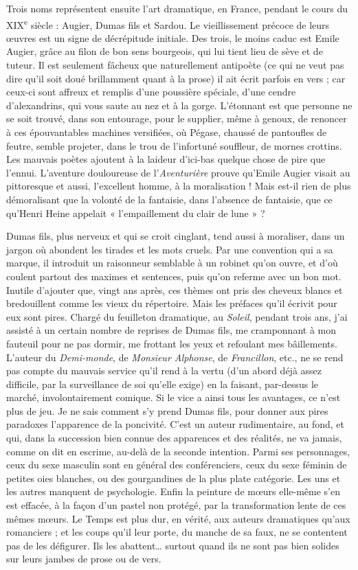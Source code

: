 \documentclass[french,twoside]{book} %
\begin{document}
Trois noms représentent ensuite l’art dramatique, en France, pendant le cours du XIX\textsuperscript{e} siècle : Augier, Dumas fils et Sardou. Le vieillissement précoce de leurs œuvres est un signe de décrépitude initiale. Des trois, le moins caduc est Emile Augier, grâce au filon de bon sens bourgeois, qui lui tient lieu de sève et de tuteur. Il est seulement fâcheux que naturellement antipoète (ce qui ne veut pas dire qu’il soit doué brillamment quant à la prose) il ait écrit parfois en vers ; car ceux-ci sont affreux et remplis d’une poussière spéciale, d’une cendre d’alexandrins, qui vous saute au nez et à la gorge. L’étonnant est que personne ne se soit trouvé, dans son entourage, pour le supplier, même à genoux, de renoncer à ces épouvantables machines versifiées, où Pégase, chaussé de pantoufles de feutre, semble projeter, dans le trou de l’infortuné souffleur, de mornes crottins. Les mauvais poètes ajoutent à la laideur d’ici-bas quelque chose de pire que l’ennui. L’aventure douloureuse de l’{\itshape Aventurière} prouve qu’Emile Augier visait au pittoresque et aussi, l’excellent homme, à la moralisation ! Mais est-il rien de plus démoralisant que la volonté de la fantaisie, dans l’absence de fantaisie, que ce qu’Henri Heine appelait « l’empaillement du clair de lune » ?\par
Dumas fils, plus nerveux et qui se croit cinglant, tend aussi à moraliser, dans un jargon où abondent les tirades et les mots cruels. Par une convention qui a sa marque, il introduit un raisonneur semblable à un robinet qu’on ouvre, et d’où coulent partout des maximes et sentences, puis qu’on referme avec un bon mot. Inutile d’ajouter que, vingt ans après, ces thèmes ont pris des cheveux blancs et bredouillent comme les vieux du répertoire. Mais les préfaces qu’il écrivit pour eux sont pires. Chargé du feuilleton dramatique, au {\itshape Soleil}, pendant trois ans, j’ai assisté à un certain nombre de reprises de Dumas fils, me cramponnant à mon fauteuil pour ne pas dormir, me frottant les yeux et refoulant mes bâillements. L’auteur du {\itshape Demi-monde}, de {\itshape Monsieur Alphonse}, de {\itshape Francillon}, etc., ne se rend pas compte du mauvais service qu’il rend à la vertu (d’un abord déjà assez difficile, par la surveillance de soi qu’elle exige) en la faisant, par-dessus le marché, involontairement comique. Si le vice a ainsi tous les avantages, ce n’est plus de jeu. Je ne sais comment s’y prend Dumas fils, pour donner aux pires paradoxes l’apparence de la poncivité. C’est un auteur rudimentaire, au fond, et qui, dans la succession bien connue des apparences et des réalités, ne va jamais, comme on dit en escrime, au-delà de la seconde intention. Parmi ses personnages, ceux du sexe masculin sont en général des conférenciers, ceux du sexe féminin de petites oies blanches, ou des gourgandines de la plus plate catégorie. Les uns et les autres manquent de psychologie. Enfin la peinture de mœurs elle-même s’en est effacée, à la façon d’un pastel non protégé, par la transformation lente de ces mêmes mœurs. Le Temps est plus dur, en vérité, aux auteurs dramatiques qu’aux romanciers ; et les coups qu’il leur porte, du manche de sa faux, ne se contentent pas de les défigurer. Ils les abattent… surtout quand ils ne sont pas bien solides sur leurs jambes de prose ou de vers.\par
\end{document}
